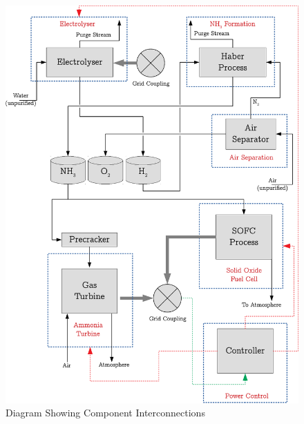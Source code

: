 \begin{figure}[p]
        \centering
        \includegraphics[scale=0.7]{plantdiagram.pdf}
        \caption{Diagram Showing Component Interconnections}
        \label{fig:plantglobaldiagram}
\end{figure}



%